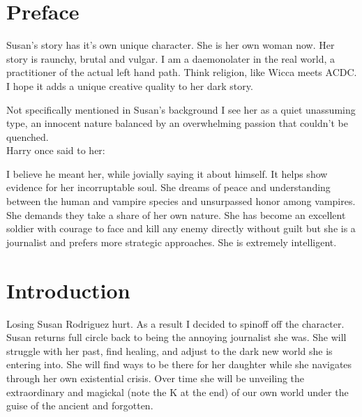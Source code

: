 \documentclass[12pt,twoside,onecolumn,openright,extrafontsizes]{memoir}
\newcommand*\NewPage{\newpage\thispagestyle{empty}\mbox{}}
\begin{document}
\begin{center}
\itshape{}
\end{center}

\frontmatter
\pagestyle{mystyle}
\chapter*{Preface}
{Susan's story has it's own unique character. She is her own woman now. Her story is raunchy, brutal and vulgar. I am a daemonolater in the real world, a practitioner of the actual left hand path. Think religion, like Wicca meets ACDC. I hope it adds a unique creative quality to her dark story.

Not specifically mentioned in Susan's background I see her as a quiet unassuming type, an innocent nature balanced by an overwhelming passion that couldn't be quenched.\\

Harry once said to her:


I believe he meant her, while jovially saying it about himself. It helps show evidence for her incorruptable soul. She dreams of peace and understanding between the human and vampire species and unsurpassed honor among vampires. She demands they take a share of her own nature. She has become an excellent soldier with courage to face and kill any enemy directly without guilt but she is a journalist and prefers more strategic approaches. She is extremely intelligent.

}
\NewPage
\chapter*{Introduction}
{Losing Susan Rodriguez hurt. As a result I decided to spinoff off the character. Susan returns full circle back to being the annoying journalist she was. She will struggle with her past, find healing, and adjust to the dark new world she is entering into. She will find ways to be there for her daughter while she navigates through her own existential crisis. Over time she will be unveiling the extraordinary and magickal (note the K at the end) of our own world under the guise of the ancient and forgotten.
}
\end{document}
